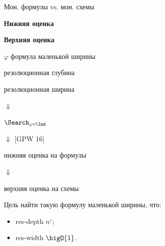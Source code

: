 \begin{frame}{Мон. формулы vs. мон. схемы}

    \begin{minipage}{0.5 \textwidth}
        \centering
        \textbf{Нижняя оценка}
    \end{minipage}%
    \begin{minipage}{0.5 \textwidth}
        \centering
        \textbf{Верхняя оценка}
    \end{minipage}
    
    \begin{center}
        $\varphi$ формула маленькой ширины
	\end{center}


    \pause
    \vspace{0.4cm}

    \begin{minipage}{0.5 \textwidth}
        \centering
        резолюционная глубина
    \end{minipage}%
    \begin{minipage}{0.5 \textwidth}
        \centering
        резолюционная ширина
    \end{minipage}

    \pause
    \vspace{0.3cm}
    \begin{center}
        $\Downarrow$
        
        \vspace{0.3cm}
        $\Search_{\varphi \circ \Ind}$
    \end{center}
 
    \pause
    \vspace{0.3cm}
    \begin{minipage}{0.5 \textwidth}
        \centering
        $\Downarrow$ [GPW 16]

        \vspace{0.3cm}

        нижняя оценка на формулы
    \end{minipage}%
    \begin{minipage}{0.5 \textwidth}
        \centering
        $\Downarrow$

        \vspace{0.3cm}

        верхняя оценка на схемы
    \end{minipage}


    \pause
    \vspace{1cm}
    Цель найти такую формулу маленькой ширины, что:
    \begin{itemize}
        \item res-depth $n^{\varepsilon}$;
        \item res-width $\bigO{1}$.
    \end{itemize}
\end{frame}


